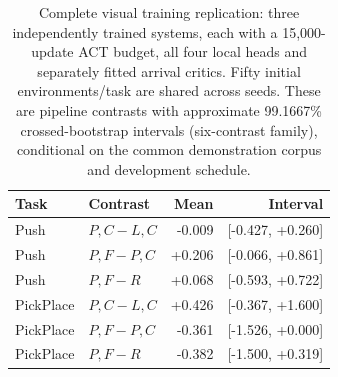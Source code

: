 \begin{table}[tb]\centering\small
\caption{Complete visual training replication: three independently trained systems, each with a 15,000-update ACT budget, all four local heads and separately fitted arrival critics. Fifty initial environments/task are shared across seeds. These are pipeline contrasts with approximate 99.1667\% crossed-bootstrap intervals (six-contrast family), conditional on the common demonstration corpus and development schedule.}\label{tab:fullseeds}
\begin{tabular}{llrr}\toprule Task & Contrast & Mean & Interval\\\midrule
Push & $P,C-L,C$ & -0.009 & [-0.427, +0.260]\\
Push & $P,F-P,C$ & +0.206 & [-0.066, +0.861]\\
Push & $P,F-R$ & +0.068 & [-0.593, +0.722]\\
PickPlace & $P,C-L,C$ & +0.426 & [-0.367, +1.600]\\
PickPlace & $P,F-P,C$ & -0.361 & [-1.526, +0.000]\\
PickPlace & $P,F-R$ & -0.382 & [-1.500, +0.319]\\
\bottomrule\end{tabular}\end{table}
